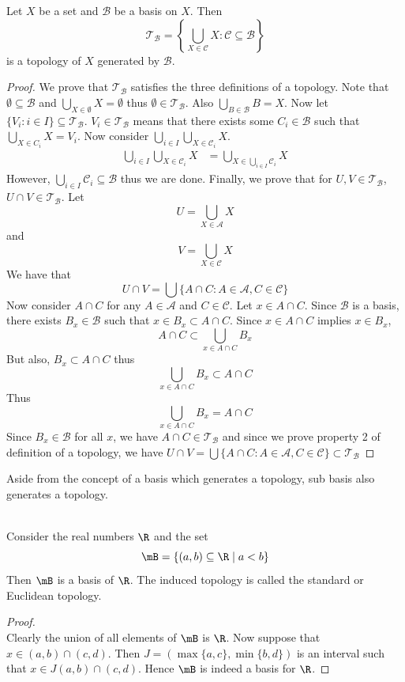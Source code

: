 \documentclass[a4paper]{article}
\begin{document}
\begin{prp}{}{} Let $X$ be a set and $\mathcal{B}$ be a basis on $X$. Then $$\mathcal{T}_\mathcal{B}=\left\{\bigcup_{X\in\mathcal{C}}X:\mathcal{C}\subseteq\mathcal{B}\right\}$$ is a topology of $X$ generated by $\mathcal{B}$. 
\begin{proof} We prove that $\mathcal{T}_\mathcal{B}$ satisfies the three definitions of a topology. Note that $\emptyset\subseteq\mathcal{B}$ and $\bigcup_{X\in\emptyset}X=\emptyset$ thus $\emptyset\in\mathcal{T}_\mathcal{B}$. Also $\bigcup_{B\in\mathcal{B}}B=X$. Now let $\{V_i:i\in I\}\subseteq\mathcal{T}_\mathcal{B}$. $V_i\in\mathcal{T}_\mathcal{B}$ means that there exists some $C_i\in\mathcal{B}$ such that $\bigcup_{X\in C_i}X=V_i$. Now consider $\bigcup_{i\in I}\bigcup_{X\in\mathcal{C}_i}X$. 
\begin{align*}
\bigcup_{i\in I}\bigcup_{X\in\mathcal{C}_i}X&=\bigcup_{X\in\bigcup_{i\in I}\mathcal{C}_i}X
\end{align*} However, $\bigcup_{i\in I}\mathcal{C}_i\subseteq\mathcal{B}$ thus we are done. Finally, we prove that for $U,V\in\mathcal{T}_\mathcal{B}$, $U\cap V\in\mathcal{T}_\mathcal{B}$. Let $$U=\bigcup_{X\in\mathcal{A}}X$$ and $$V=\bigcup_{X\in\mathcal{C}}X$$ We have that $$U\cap V=\bigcup\{A\cap C:A\in\mathcal{A}, C\in\mathcal{C}\}$$ Now consider $A\cap C$ for any $A\in\mathcal{A}$ and $C\in\mathcal{C}$. Let $x\in A\cap C$. Since $\mathcal{B}$ is a basis, there exists $B_x\in\mathcal{B}$ such that $x\in B_x\subset A\cap C$. Since $x\in A\cap C$ implies $x\in B_x$, $$A\cap C\subset\bigcup_{x\in A\cap C}B_x$$ But also, $B_x\subset A\cap C$ thus $$\bigcup_{x\in A\cap C}B_x\subset A\cap C$$ Thus $$\bigcup_{x\in A\cap C}B_x=A\cap C$$ Since $B_x\in\mathcal{B}$ for all $x$, we have $A\cap C\in\mathcal{T}_\mathcal{B}$ and since we prove property 2 of definition of a topology, we have $U\cap V=\bigcup\{A\cap C:A\in\mathcal{A}, C\in\mathcal{C}\}\subset\mathcal{T}_\mathcal{B}$
\end{proof}
\end{prp}

Aside from the concept of a basis which generates a topology, sub basis also generates a topology. 

\begin{eg}{}{}\\
Consider the real numbers $\R$ and the set $$\mB=\{(a,b)\subseteq\R\;|\;a<b\}$$ Then $\mB$ is a basis of $\R$. The induced topology is called the standard or Euclidean topology. 
\begin{proof}\\
Clearly the union of all elements of $\mB$ is $\R$. Now suppose that $x\in(a,b)\cap(c,d)$. Then $J=(\max\{a,c\},\min\{b,d\})$ is an interval such that $x\in J(a,b)\cap(c,d)$. Hence $\mB$ is indeed a basis for $\R$. 
\end{proof}
\end{eg}
\end{document}
